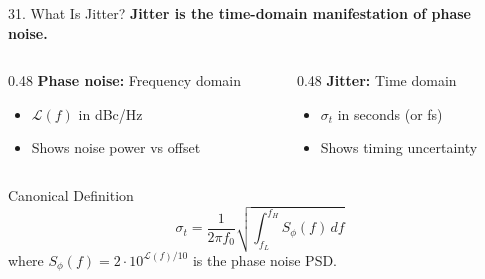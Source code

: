 \documentclass[aspectratio=169, 11pt]{beamer}
\begin{document}
\begin{frame}{31. What Is Jitter?}
    \textbf{Jitter is the time-domain manifestation of phase noise.}

    \vspace{0.5em}
    \begin{columns}[T]
        \begin{column}{0.48\textwidth}
            \textbf{Phase noise:} Frequency domain
            \begin{itemize}
                \item $\mathcal{L}(f)$ in dBc/Hz
                \item Shows noise power vs offset
            \end{itemize}
        \end{column}
        \begin{column}{0.48\textwidth}
            \textbf{Jitter:} Time domain
            \begin{itemize}
                \item $\sigma_t$ in seconds (or fs)
                \item Shows timing uncertainty
            \end{itemize}
        \end{column}
    \end{columns}

    \vspace{0.5em}
    \begin{block}{Canonical Definition}
        \[ \sigma_t = \frac{1}{2\pi f_0} \sqrt{\int_{f_L}^{f_H} S_\phi(f) \, df} \]
        where $S_\phi(f) = 2 \cdot 10^{\mathcal{L}(f)/10}$ is the phase noise PSD.
    \end{block}
\end{frame}
\end{document}
